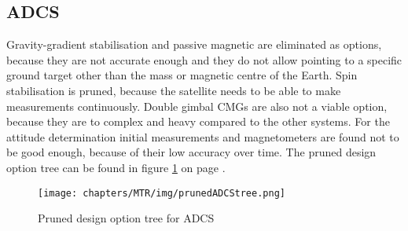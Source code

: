 \subsection{\ac{ADCS}}
\label{mtrTOpruneadcs}
Gravity-gradient stabilisation and passive magnetic are eliminated as options, because they are not accurate enough and they do not allow pointing to a specific ground target other than the mass or magnetic centre of the Earth. Spin stabilisation is pruned, because the satellite needs to be able to make measurements continuously. Double gimbal \acp{CMG} are also not a viable option, because they are to complex and heavy compared to the other systems.
For the attitude determination initial measurements and magnetometers are found not to be good enough, because of their low accuracy over time.
The pruned design option tree can be found in figure \ref{fig:mtrTOpruneadcs} on page \pageref{fig:mtrTOpruneadcs}.

\begin{figure}
\texttt{[image: chapters/MTR/img/prunedADCStree.png]}
\label{fig:mtrTOpruneadcs}
\caption{Pruned design option tree for \ac{ADCS}}
\end{figure}